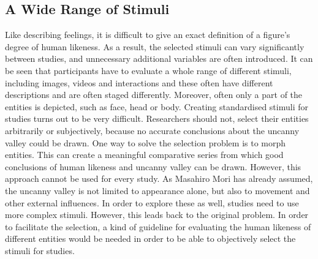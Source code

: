 \subsection{A Wide Range of Stimuli}
Like describing feelings, it is difficult to give an exact definition of a figure's degree of human likeness. As a result, the selected stimuli can vary significantly between studies, and unnecessary additional variables are often introduced. 
It can be seen that participants have to evaluate a whole range of different stimuli, including images, videos and interactions and these often have different descriptions and are often staged differently. Moreover, often only a part of the entities is depicted, such as face, head or body.
Creating standardised stimuli for studies turns out to be very difficult. Researchers should not, select their entities arbitrarily or subjectively, because no accurate conclusions about the uncanny valley could be drawn. 
One way to solve the selection problem is to morph entities. This can create a meaningful comparative series from which good conclusions of human likeness and uncanny valley can be drawn. However, this approach cannot be used for every study. As Masahiro Mori has already assumed, the uncanny valley is not limited to appearance alone, but also to movement and other external influences. In order to explore these as well, studies need to use more complex stimuli. However, this leads back to the original problem.  In order to facilitate the selection, a kind of guideline for evaluating the human likeness of different entities would be needed in order to be able to objectively select the stimuli for studies. 

